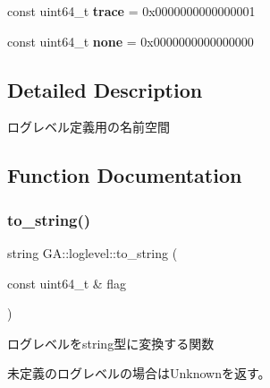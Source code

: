 \begin{DoxyCompactItemize}
const uint64\+\_\+t {\bfseries trace} = 0x00\textquotesingle{}00\textquotesingle{}00\textquotesingle{}00\textquotesingle{}00\textquotesingle{}00\textquotesingle{}00\textquotesingle{}01
\item 
\mbox{\label{namespace_g_a_1_1loglevel_a2e5555cd209d73ca7eb60a2164fdaf1c}} 
const uint64\+\_\+t {\bfseries none} = 0x00\textquotesingle{}00\textquotesingle{}00\textquotesingle{}00\textquotesingle{}00\textquotesingle{}00\textquotesingle{}00\textquotesingle{}00
\end{DoxyCompactItemize}


\subsection{Detailed Description}
ログレベル定義用の名前空間 



\subsection{Function Documentation}
\mbox{\label{namespace_g_a_1_1loglevel_a9319a21550f7dfdd3229358e00009ce4}} 
\subsubsection{\texorpdfstring{to\_string()}{to\_string()}}
{\footnotesize\ttfamily string G\+A\+::loglevel\+::to\+\_\+string (\begin{DoxyParamCaption}\item[{const uint64\+\_\+t \&}]{flag }\end{DoxyParamCaption})}



ログレベルをstring型に変換する関数 

未定義のログレベルの場合は\+Unknownを返す。 